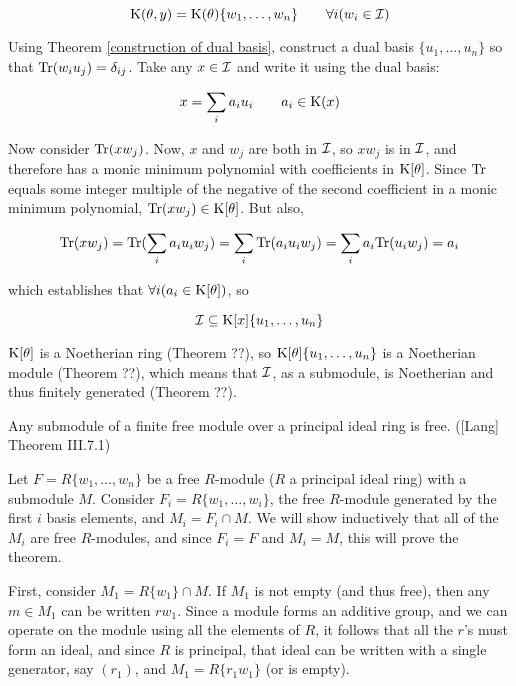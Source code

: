 $${\rm K}(\theta,y) = {\rm K}(\theta)\{w_1,\ldots,w_n\} \qquad \forall i(w_i \in {\cal I})$$

Using Theorem \ref{construction of dual basis}, construct a dual basis
$\{u_1,\ldots,u_n\}$ so that ${\rm Tr}(w_i u_j) = \delta_{ij}$.  Take
any $x \in {\cal I}$ and write it using the dual basis:

$$x = \sum_i a_i u_i \qquad a_i \in {\rm K}(x)$$

Now consider ${\rm Tr}(x w_j)$.  Now, $x$ and $w_j$ are both in ${\cal
I}$, so $x w_j$ is in ${\cal I}$, and therefore has a monic minimum
polynomial with coefficients in ${\rm K}[\theta]$.  Since ${\rm Tr}$ equals
some integer multiple of the negative of the second coefficient in a
monic minimum polynomial, ${\rm Tr}(x w_j) \in {\rm K}[\theta]$.  But also,

$${\rm Tr}(x w_j) = {\rm Tr}(\sum_i a_i u_i w_j)
 = \sum_i {\rm Tr}(a_i u_i w_j) %
 = \sum_i a_i {\rm Tr}(u_i w_j) %
 = a_i$$

which establishes that $\forall i (a_i \in {\rm K}[\theta])$, so

$${\cal I} \subseteq {\rm K}[x]\{u_1,\ldots,u_n\} $$

${\rm K}[\theta]$ is a Noetherian ring (Theorem ??), so ${\rm
K}[\theta]\{u_1,\ldots,u_n\}$ is a Noetherian module (Theorem ??),
which means that ${\cal I}$, as a submodule, is Noetherian
and thus finitely generated (Theorem ??).

\endtheorem


\theorem
\label{submodules of free modules over PIRs are free}

Any submodule of a finite free module over a principal ideal ring is free.
([Lang] Theorem III.7.1)

\proof

Let $F = R\{w_1,\ldots,w_n\}$ be a free $R$-module ($R$ a principal
ideal ring) with a submodule $M$.  Consider $F_i =
R\{w_1,\ldots,w_i\}$, the free $R$-module generated by the first $i$
basis elements, and $M_i = F_i \cap M$.  We will show inductively that
all of the $M_i$ are free $R$-modules, and since $F_i = F$ and $M_i =
M$, this will prove the theorem.

First, consider $M_1 = R\{w_1\} \cap M$.  If $M_1$ is not empty (and
thus free), then any $m \in M_1$ can be written $r w_1$.  Since a
module forms an additive group, and we can operate on the module using
all the elements of $R$, it follows that all the $r$'s must form an
ideal, and since $R$ is principal, that ideal can be written with a
single generator, say $(r_1)$, and $M_1 = R\{r_1 w_1\}$ (or is empty).

